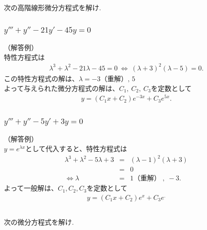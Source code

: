 \documentclass[a4paper,11pt,fleqn]{jarticle}
\begin{document}
\newpage
\subsection{}
次の高階線形微分方程式を解け.
\subsubsection{$y'''+y''-21y'-45y=0$}
（解答例） \\
特性方程式は
\begin{eqnarray*}
\lambda^3+\lambda^2-21\lambda-45=0 \ 
\Leftrightarrow \ (\lambda+3)^2(\lambda-5)=0.
\end{eqnarray*}
この特性方程式の解は、$\lambda=-3\mbox{（重解）, \ 5}$ \\
よって与えられた微分方程式の解は、$C_1, \ C_2, \ C_3$を定数として
\begin{eqnarray*}
y=(C_1x+C_2)e^{-3x}+C_3 e^{5x}.
\end{eqnarray*}

\subsubsection{$y'''+y''-5y'+3y=0$}
（解答例）\\
$y=e^{\lambda x}$として代入すると、特性方程式は
\begin{eqnarray*}
\lambda^3+\lambda^2-5\lambda+3 &=& (\lambda-1)^2(\lambda+3) \\
&=& 0 \\
\Leftrightarrow \lambda &=& 1 （重解） \; , \; -3.
\end{eqnarray*}
よって一般解は、$C_1,C_2,C_3$を定数として
\begin{eqnarray*}
y=(C_1x+C_2)e^{x}+C_3e^.
\end{eqnarray*}


\newpage
\subsection{}
次の微分方程式を解け.
\end{document}
